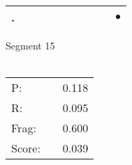 \documentclass[landscape]{article}
\newcommand{\ssp}{\hspace{2pt}}
\newcommand{\mex}{\cellcolor{g}$\bullet$}
\begin{document}
\begin{tabular}{|l|p{10pt}|p{10pt}|p{10pt}|p{10pt}|p{10pt}|p{10pt}|p{10pt}|p{10pt}|p{10pt}|}
\hline
\ssp \cellcolor{ref8}. \ssp&\hspace{2pt}&\hspace{2pt}&\hspace{2pt}&\hspace{2pt}&\hspace{2pt}&\hspace{2pt}&\hspace{2pt}&\hspace{2pt}&\hspace{2pt}\mex\\
\hline
\end{tabular}

\vspace{6pt}
\noindent Segment 15\\\\
\noindent\begin{tabular}{lm{12pt}r}
\hline
P:&&0.118\\
R:&&0.095\\
Frag:&&0.600\\
Score:&&0.039\\
\end{tabular}

\newpage
\end{document}

